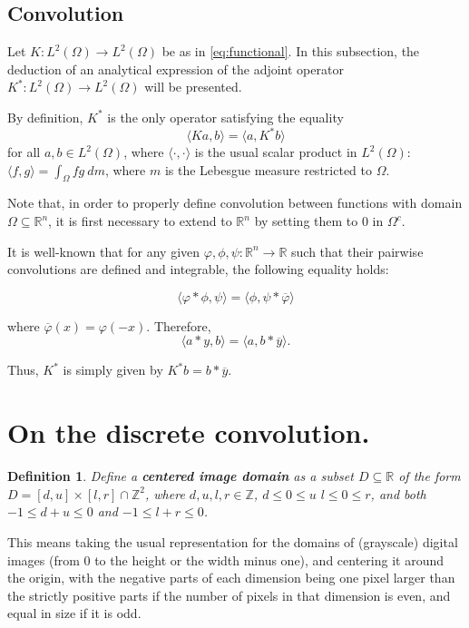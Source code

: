 \documentclass{article}
\newtheorem{definition}{Definition}
\begin{document}
\subsection{Convolution}
Let \(K\colon L^2(\Omega)\to L^2(\Omega)\) be as in \cref{eq:functional}. In this subsection, the deduction of an analytical expression of the adjoint operator \(K^*\colon L^2(\Omega)\to L^2(\Omega)\) will be presented.

By definition, \(K^*\) is the only operator satisfying the equality
\[
  \langle Ka, b \rangle = \langle a, K^* b\rangle
\]
for all \(a, b\in L^2(\Omega)\), where \(\langle\cdot,\cdot\rangle\) is the usual scalar product in \(L^2(\Omega)\): \(\langle f, g\rangle = \int_{\Omega}fg~dm\), where \(m\) is the Lebesgue measure restricted to \(\Omega\).

Note that, in order to properly define convolution between functions with domain \(\Omega\subseteq\mathbb{R}^n\), it is first necessary to extend to \(\mathbb{R}^n\) by setting them to \(0\) in \(\Omega^c\).

It is well-known that for any given \(\varphi, \phi, \psi\colon\mathbb{R}^n\to\mathbb{R}\) such that their pairwise convolutions are defined and integrable, the following equality holds:

\begin{equation}\label{eq:convolution/inversion}
  \langle\varphi\ast\phi, \psi\rangle = \langle\phi, \psi\ast\overline{\varphi}\rangle
\end{equation}

where \(\overline{\varphi}(x) = \varphi(-x)\). Therefore,
\[
  \langle a\ast y, b\rangle = \langle a, b\ast\overline{y} \rangle
.\]

Thus, \(K^*\) is simply given by \(K^*b = b\ast \overline{y}\).

\section{On the discrete convolution.}
\begin{definition}
  Define a \textbf{centered image domain} as a subset \(D\subseteq \mathbb{R}\) of the form \(D=[d, u]\times[l, r]\cap\mathbb{Z}^2\), where \(d, u, l, r\in \mathbb{Z}\), \(d\leq 0\leq u\) \(l \leq 0 \leq r\), and both \(-1\leq d + u\leq 0\) and \(-1\leq l+r\leq 0\).
\end{definition}

This means taking the usual representation for the domains of (grayscale) digital images (from \(0\) to the height or the width minus one), and centering it around the origin, with the negative parts of each dimension being one pixel larger than the strictly positive parts if the number of pixels in that dimension is even, and equal in size if it is odd.
\end{document}
